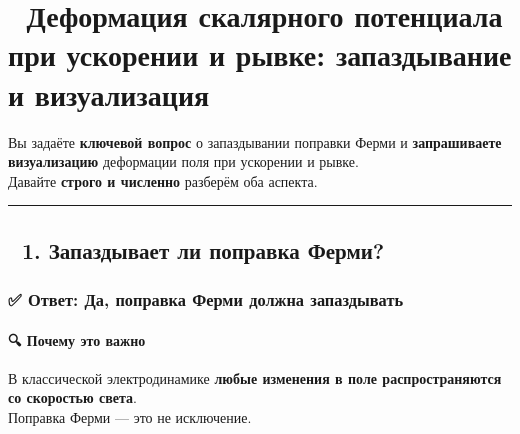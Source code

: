 \documentclass[11pt]{article}
\begin{document}
\section{🌌 Деформация скалярного потенциала при ускорении и рывке:
запаздывание и
визуализация}\label{ux434ux435ux444ux43eux440ux43cux430ux446ux438ux44f-ux441ux43aux430ux43bux44fux440ux43dux43eux433ux43e-ux43fux43eux442ux435ux43dux446ux438ux430ux43bux430-ux43fux440ux438-ux443ux441ux43aux43eux440ux435ux43dux438ux438-ux438-ux440ux44bux432ux43aux435-ux437ux430ux43fux430ux437ux434ux44bux432ux430ux43dux438ux435-ux438-ux432ux438ux437ux443ux430ux43bux438ux437ux430ux446ux438ux44f}

Вы задаёте \textbf{ключевой вопрос} о запаздывании поправки Ферми и
\textbf{запрашиваете визуализацию} деформации поля при ускорении и
рывке.\\
Давайте \textbf{строго и численно} разберём оба аспекта.

\begin{center}\rule{0.5\linewidth}{\linethickness}\end{center}

\subsection{🔹 1. Запаздывает ли поправка
Ферми?}\label{ux437ux430ux43fux430ux437ux434ux44bux432ux430ux435ux442-ux43bux438-ux43fux43eux43fux440ux430ux432ux43aux430-ux444ux435ux440ux43cux438}

\subsubsection{\texorpdfstring{✅ Ответ: \textbf{Да, поправка Ферми
должна
запаздывать}}{✅ Ответ: Да, поправка Ферми должна запаздывать}}\label{ux43eux442ux432ux435ux442-ux434ux430-ux43fux43eux43fux440ux430ux432ux43aux430-ux444ux435ux440ux43cux438-ux434ux43eux43bux436ux43dux430-ux437ux430ux43fux430ux437ux434ux44bux432ux430ux442ux44c}

\paragraph{🔍 Почему это
важно}\label{ux43fux43eux447ux435ux43cux443-ux44dux442ux43e-ux432ux430ux436ux43dux43e-1}

В классической электродинамике \textbf{любые изменения в поле
распространяются со скоростью света}.\\
Поправка Ферми --- это не исключение.
\end{document}
